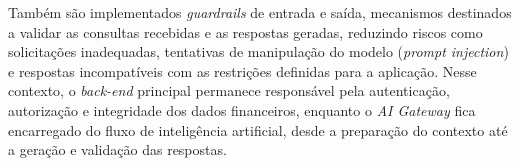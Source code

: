 \documentclass[12pt]{article}
\begin{document}
      Também são implementados \textit{guardrails} de entrada e saída, mecanismos destinados a validar as consultas recebidas e as respostas geradas, reduzindo riscos como solicitações inadequadas, tentativas de manipulação do modelo (\textit{prompt injection}) e respostas incompatíveis com as restrições definidas para a aplicação. Nesse contexto, o \textit{back-end} principal permanece responsável pela autenticação, autorização e integridade dos dados financeiros, enquanto o \textit{AI Gateway} fica encarregado do fluxo de inteligência artificial, desde a preparação do contexto até a geração e validação das respostas.

\nocite{*}


\end{document}
